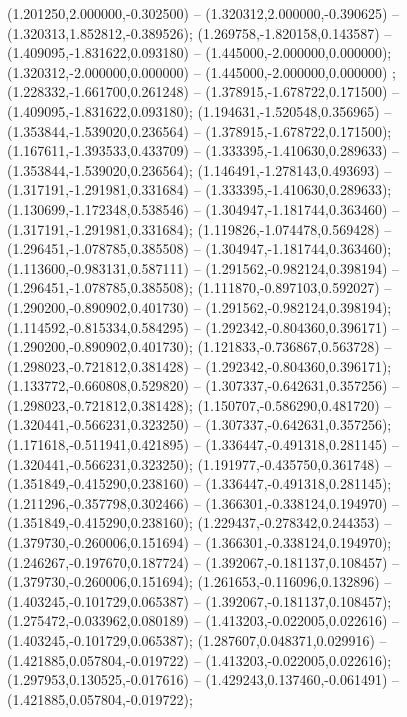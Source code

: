 (1.201250,2.000000,-0.302500) -- (1.320312,2.000000,-0.390625) -- (1.320313,1.852812,-0.389526);
 (1.269758,-1.820158,0.143587) -- (1.409095,-1.831622,0.093180) -- (1.445000,-2.000000,0.000000);
 (1.320312,-2.000000,0.000000) -- (1.445000,-2.000000,0.000000) ;
 (1.228332,-1.661700,0.261248) -- (1.378915,-1.678722,0.171500) -- (1.409095,-1.831622,0.093180);
 (1.194631,-1.520548,0.356965) -- (1.353844,-1.539020,0.236564) -- (1.378915,-1.678722,0.171500);
 (1.167611,-1.393533,0.433709) -- (1.333395,-1.410630,0.289633) -- (1.353844,-1.539020,0.236564);
 (1.146491,-1.278143,0.493693) -- (1.317191,-1.291981,0.331684) -- (1.333395,-1.410630,0.289633);
 (1.130699,-1.172348,0.538546) -- (1.304947,-1.181744,0.363460) -- (1.317191,-1.291981,0.331684);
 (1.119826,-1.074478,0.569428) -- (1.296451,-1.078785,0.385508) -- (1.304947,-1.181744,0.363460);
 (1.113600,-0.983131,0.587111) -- (1.291562,-0.982124,0.398194) -- (1.296451,-1.078785,0.385508);
 (1.111870,-0.897103,0.592027) -- (1.290200,-0.890902,0.401730) -- (1.291562,-0.982124,0.398194);
 (1.114592,-0.815334,0.584295) -- (1.292342,-0.804360,0.396171) -- (1.290200,-0.890902,0.401730);
 (1.121833,-0.736867,0.563728) -- (1.298023,-0.721812,0.381428) -- (1.292342,-0.804360,0.396171);
 (1.133772,-0.660808,0.529820) -- (1.307337,-0.642631,0.357256) -- (1.298023,-0.721812,0.381428);
 (1.150707,-0.586290,0.481720) -- (1.320441,-0.566231,0.323250) -- (1.307337,-0.642631,0.357256);
 (1.171618,-0.511941,0.421895) -- (1.336447,-0.491318,0.281145) -- (1.320441,-0.566231,0.323250);
 (1.191977,-0.435750,0.361748) -- (1.351849,-0.415290,0.238160) -- (1.336447,-0.491318,0.281145);
 (1.211296,-0.357798,0.302466) -- (1.366301,-0.338124,0.194970) -- (1.351849,-0.415290,0.238160);
 (1.229437,-0.278342,0.244353) -- (1.379730,-0.260006,0.151694) -- (1.366301,-0.338124,0.194970);
 (1.246267,-0.197670,0.187724) -- (1.392067,-0.181137,0.108457) -- (1.379730,-0.260006,0.151694);
 (1.261653,-0.116096,0.132896) -- (1.403245,-0.101729,0.065387) -- (1.392067,-0.181137,0.108457);
 (1.275472,-0.033962,0.080189) -- (1.413203,-0.022005,0.022616) -- (1.403245,-0.101729,0.065387);
 (1.287607,0.048371,0.029916) -- (1.421885,0.057804,-0.019722) -- (1.413203,-0.022005,0.022616);
 (1.297953,0.130525,-0.017616) -- (1.429243,0.137460,-0.061491) -- (1.421885,0.057804,-0.019722);

